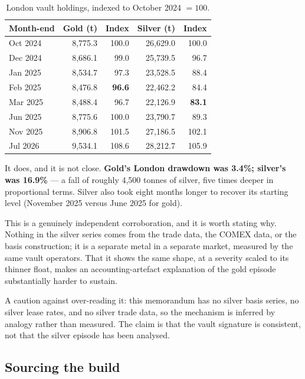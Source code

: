 \documentclass[11pt,a4paper]{article}
\begin{document}
\begin{table}[h]
\centering
\begin{tabular}{@{}lrrrr@{}}
\toprule
\textbf{Month-end} & \textbf{Gold (t)} & \textbf{Index} & \textbf{Silver (t)} & \textbf{Index} \\
\midrule
Oct 2024 & 8{,}775.3 & 100.0 & 26{,}629.0 & 100.0 \\
Dec 2024 & 8{,}686.1 & 99.0 & 25{,}739.5 & 96.7 \\
Jan 2025 & 8{,}534.7 & 97.3 & 23{,}528.5 & 88.4 \\
Feb 2025 & 8{,}476.8 & \textbf{96.6} & 22{,}462.2 & 84.4 \\
Mar 2025 & 8{,}488.4 & 96.7 & 22{,}126.9 & \textbf{83.1} \\
Jun 2025 & 8{,}775.6 & 100.0 & 23{,}790.7 & 89.3 \\
Nov 2025 & 8{,}906.8 & 101.5 & 27{,}186.5 & 102.1 \\
Jul 2026 & 9{,}534.1 & 108.6 & 28{,}212.7 & 105.9 \\
\bottomrule
\end{tabular}
\caption{London vault holdings, indexed to October 2024 $=100$.}
\label{tab:silver}
\end{table}

It does, and it is not close. \textbf{Gold's London drawdown was 3.4\%; silver's was 16.9\%} ---
a fall of roughly 4{,}500 tonnes of silver, five times deeper in proportional terms. Silver also
took eight months longer to recover its starting level (November 2025 versus June 2025 for
gold).

This is a genuinely independent corroboration, and it is worth stating why. Nothing in the
silver series comes from the trade data, the COMEX data, or the basis construction; it is a
separate metal in a separate market, measured by the same vault operators. That it shows the
same shape, at a severity scaled to its thinner float, makes an accounting-artefact explanation
of the gold episode substantially harder to sustain.

A caution against over-reading it: this memorandum has no silver basis series, no silver lease
rates, and no silver trade data, so the mechanism is inferred by analogy rather than measured.
The claim is that the vault signature is consistent, not that the silver episode has been
analysed.

\subsection{Sourcing the build}
\end{document}
